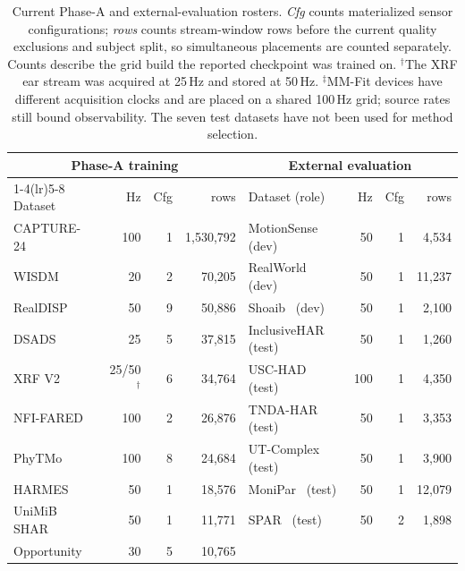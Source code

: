 \begin{table}[t]
  \centering
  \caption{Current Phase-A and external-evaluation rosters. \emph{Cfg} counts materialized sensor
  configurations; \emph{rows} counts stream-window rows before the current quality exclusions and
  subject split, so simultaneous placements are counted separately. Counts describe the grid build
  the reported checkpoint was trained on.  $^\dagger$The XRF ear stream was
  acquired at 25\,Hz and stored at 50\,Hz. $^\ddagger$MM-Fit devices have different acquisition
  clocks and are placed on a shared 100\,Hz grid; source rates still bound observability. The seven
  test datasets have not been used for method selection.}
  \label{tab:datasets}
  \scriptsize
  \setlength{\tabcolsep}{3.2pt}
  \begin{tabular}{@{}lrrr@{\hspace{8mm}}lrrr@{}}
    \toprule
    \multicolumn{4}{c}{Phase-A training} & \multicolumn{4}{c}{External evaluation} \\
    \cmidrule(lr){1-4}\cmidrule(lr){5-8}
    Dataset & Hz & Cfg & rows & Dataset (role) & Hz & Cfg & rows \\
    \midrule
    CAPTURE-24~\cite{chan2024capture24} & 100 & 1 & 1,530,792
      & MotionSense~\cite{motionsense} (dev) & 50 & 1 & 4,534 \\
    WISDM~\cite{wisdm} & 20 & 2 & 70,205
      & RealWorld~\cite{realworld} (dev) & 50 & 1 & 11,237 \\
    RealDISP~\cite{realdisp} & 50 & 9 & 50,886
      & Shoaib~\cite{shoaib} (dev) & 50 & 1 & 2,100 \\
    DSADS~\cite{dsads} & 25 & 5 & 37,815
      & InclusiveHAR~\cite{inclusivehar} (test) & 50 & 1 & 1,260 \\
    XRF V2~\cite{xrf_v2} & 25/50$^\dagger$ & 6 & 34,764
      & USC-HAD~\cite{usc_had} (test) & 100 & 1 & 4,350 \\
    NFI-FARED~\cite{nfi_fared} & 100 & 2 & 26,876
      & TNDA-HAR~\cite{tnda_har} (test) & 50 & 1 & 3,353 \\
    PhyTMo~\cite{phytmo} & 100 & 8 & 24,684
      & UT-Complex~\cite{ut_complex} (test) & 50 & 1 & 3,900 \\
    HARMES~\cite{harmes} & 50 & 1 & 18,576
      & MoniPar~\cite{monipar} (test) & 50 & 1 & 12,079 \\
    UniMiB SHAR~\cite{unimibi} & 50 & 1 & 11,771
      & SPAR~\cite{spar} (test) & 50 & 2 & 1,898 \\
    Opportunity~\cite{opportunity_challenge} & 30 & 5 & 10,765

\end{tabular}
\end{table}
